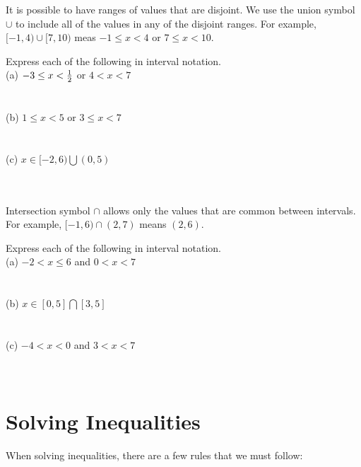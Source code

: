 It is possible to have ranges of values that are disjoint. We use the union symbol $ \cup $ to include all of the values in any of the disjoint ranges. For example, $ [-1, 4) \cup [7, 10) $ meas $ -1 \le x < 4 $ or $ 7 \le x < 10 $. \\

\begin{exercise}\nonumber
	Express each of the following in interval notation. \\

	(a) $ -3 \le x < {1 \over 2} $ or $ 4 < x < 7 $ \\
	\\
	\\

	(b) $ 1 \le x < 5 $ or $ 3 \le x < 7 $ \\
	\\
	\\

	(c) $ x \in [-2, 6) \bigcup (0, 5) $ \\
	\\
	\\
\end{exercise}

Intersection symbol $ \cap $ allows only the values that are common between intervals. For example, $ [-1, 6) \cap (2, 7) $ means $ (2, 6) $. \\

\begin{exercise}\nonumber
	Express each of the following in interval notation. \\

	(a) $ -2 < x \le 6 $ and $ 0 < x < 7 $ \\
	\\
	\\

	(b) $ x \in [0, 5] \bigcap [3, 5] $ \\
	\\
	\\

	(c) $ -4 < x < 0 $ and $ 3 < x < 7 $ \\
	\\
	\\
\end{exercise}

\section{Solving Inequalities}

When solving inequalities, there are a few rules that we must follow: \\

